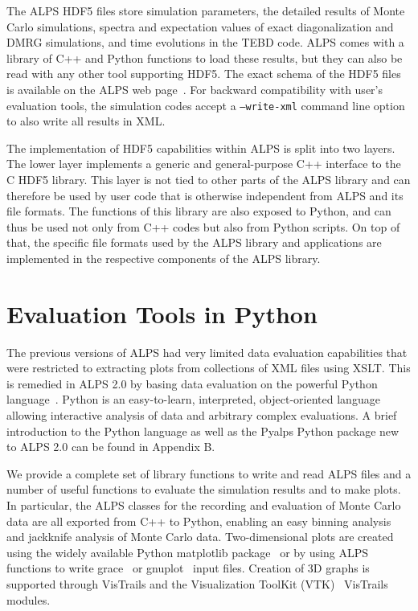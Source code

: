\documentclass[12pt]{iopart}
\begin{document}
The ALPS HDF5 files store simulation parameters, the detailed results of Monte Carlo simulations, spectra and expectation values of exact diagonalization and DMRG simulations, and time evolutions in the TEBD code. ALPS comes with a library of C++ and Python functions to load these results, but they can also be read with any other tool supporting HDF5. The exact schema of the HDF5 files is available on the ALPS web page~\cite{alps}. For backward compatibility with user's evaluation tools, the simulation codes accept a {\tt --write-xml} command line option to also write all results in XML.

The implementation of HDF5 capabilities within ALPS is split into two layers. The lower layer implements a generic and general-purpose C++ interface to the C HDF5 library. This layer is not tied to other parts of the ALPS library and can therefore be used by user code that is otherwise independent from ALPS and its file formats. The functions of this library are also exposed to Python, and can thus be used not only from C++ codes but also from Python scripts. On top of that, the specific file formats used by the ALPS library and applications are implemented in the respective components of the ALPS library.

\section{Evaluation Tools in Python}

The previous versions of ALPS had very limited data evaluation capabilities that were restricted to extracting plots from collections of XML files using XSLT. This is remedied in ALPS 2.0 by basing data evaluation on the powerful Python language~\cite{python}. Python is an easy-to-learn, interpreted, object-oriented language allowing interactive analysis of data and arbitrary complex evaluations.  A brief introduction to the Python language as well as the Pyalps Python package new to ALPS 2.0 can be found in Appendix B.

We provide a complete set of library functions to write and read ALPS files and a number of useful functions to evaluate the simulation results and to make plots. In particular, the ALPS classes for the recording and evaluation of Monte Carlo data are all exported from C++ to Python, enabling an easy binning analysis~\cite{Ambegaokar2010} and jackknife analysis of Monte Carlo data.
Two-dimensional plots are created using the widely available Python matplotlib package~\cite{matplotlib} or by using ALPS functions to write grace~\cite{grace} or gnuplot~\cite{gnuplot} input files. Creation of 3D graphs is supported through VisTrails and the Visualization ToolKit (VTK)~\cite{vtk} VisTrails modules.
\end{document}
